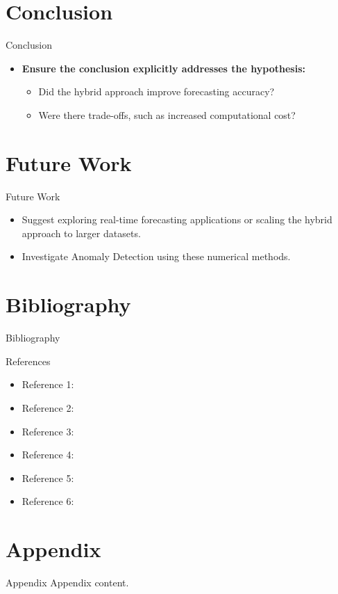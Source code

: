 \documentclass[pt]{beamer}
\newenvironment{tres important}[2][]{
	\setkeys{EmphEqEnv}{#2}
	\setkeys{EmphEqOpt}{box={\setlength{\fboxsep}{10pt}\fcolorbox{myNewColorA}{white}},#1}
	\EmphEqMainEnv}
{\endEmphEqMainEnv}
\begin{document}
\section{Conclusion }
\begin{frame}{Conclusion}
    \begin{itemize}
    \item \textbf{Ensure the conclusion explicitly addresses the hypothesis:}
        \begin{itemize}
            \item Did the hybrid approach improve forecasting accuracy?
            \item Were there trade-offs, such as increased computational cost?
        \end{itemize}
    \end{itemize}
\end{frame}

\section{Future Work}
\begin{frame}{Future Work}
    \begin{itemize}
        \item Suggest exploring real-time forecasting applications or scaling the hybrid approach to larger datasets.
        \item Investigate Anomaly Detection using these numerical methods.
    \end{itemize}
\end{frame}

\section{Bibliography}
\begin{frame}{Bibliography}
    
    
\end{frame}

\begin{frame}{References}
    \begin{itemize}
        \item Reference 1:
        \cite{10583885}
        \item Reference 2: 
        \cite{WAQAS2024}
        \item Reference 3: 
        \cite{unknown}
        \item Reference 4: 
        \cite{article}
        \item Reference 5:
        \cite{numerical_analysis}
        \item Reference 6:
        \cite{harvard_unit27}
    \end{itemize}
\end{frame}

\section{Appendix}
\begin{frame}{Appendix}
    Appendix content.
\end{frame}
\end{document}
